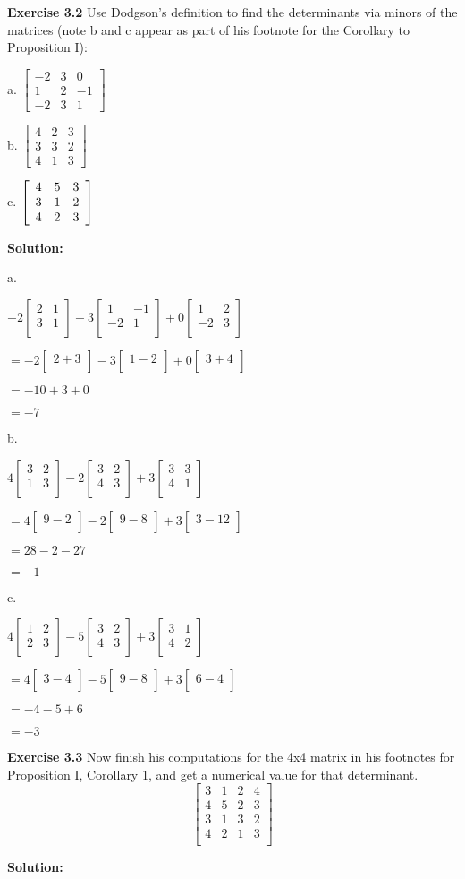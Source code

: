 \documentclass[12pt]{article}
\newcommand{\sol} {\textbf{Solution:}}
\newcommand{\matx}[1] {
\begin{bmatrix}
  #1 \\
\end{bmatrix}
}
\newcommand{\matxx}[2] {
\begin{bmatrix}
  #1 \\
  #2 \\
\end{bmatrix}
}
\newcommand{\matxxxx}[4] {
\begin{bmatrix}
  #1 \\
  #2 \\
  #3 \\
  #4 \\
\end{bmatrix}
}
\begin{document}
\bigskip
\noindent\textbf{Exercise 3.2} Use Dodgson's definition to find the
determinants via minors of the matrices (note b and c appear as part of his
footnote for the Corollary to Proposition I):

a. $%
\begin{bmatrix}
-2 & 3 & 0\\
1 & 2 & -1\\
-2 & 3 & 1
\end{bmatrix}
$

b. $%
\begin{bmatrix}
4 & 2 & 3\\
3 & 3 & 2\\
4 & 1 & 3
\end{bmatrix}
$

c. $\left[
\begin{array}
[c]{ccc}%
4 & 5 & 3\\
3 & 1 & 2\\
4 & 2 & 3
\end{array}
\right]  $

\bigskip

\sol

a. 

\(-2 \matxx{2 & 1}{3 & 1} -3 \matxx{1 & -1}{-2 & 1} + 0 \matxx{1 &2}{-2 &3}\)

\(=-2 \matx{2 + 3} -3 \matx{1 - 2} + 0\matx{3 + 4}\)

\(= -10 + 3 + 0\)

\(= -7 \)

\bigskip
b.

\(4 \matxx{3 & 2}{1 & 3} -2 \matxx{3 & 2}{4 & 3} + 3 \matxx{3 &3}{4 &1}\)

\(=4 \matx{9 - 2} -2 \matx{9 - 8} + 3\matx{3 - 12}\)

\(= 28 - 2 - 27\)

\(= -1 \)

\bigskip
c.

\(4 \matxx{1 & 2}{2 & 3} -5 \matxx{3 & 2}{4 & 3} + 3 \matxx{3 &1}{4 &2}\)

\(=4 \matx{3 - 4} -5 \matx{9 - 8} + 3\matx{6 - 4}\)

\(= -4 - 5 + 6\)

\(= -3 \)


\bigskip
\noindent\textbf{Exercise 3.3} Now finish his computations for the 4x4 matrix
in his footnotes for Proposition I, Corollary 1, and get a numerical value for
that determinant.
\[
\matxxxx{3&1&2&4}
		{4&5&2&3}
       	{3&1&3&2}
        {4&2&1&3}
\]


\bigskip
\sol
\end{document}
